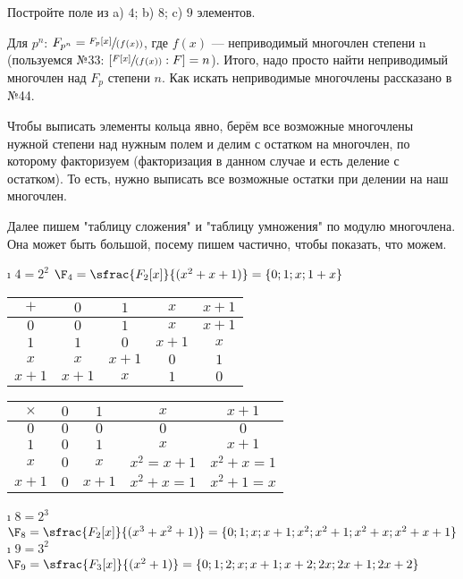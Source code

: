 \begin{problem}[45 (11.3)]
Постройте поле из a) $4$; b) $8$; c) $9$ элементов.
\end{problem}
\begin{solution}

Для \(p^n\): \(F_{p^n} = \sfrac{F_p[x]}{(f(x))}\), где \(f(x)\) --- неприводимый многочлен степени n (пользуемся №33: $[\sfrac{F[x]}{(f(x))}:F] = n$). Итого, надо просто найти неприводимый многочлен над \(F_p\) степени \(n\). Как искать неприводимые многочлены рассказано в №44.

Чтобы выписать элементы кольца явно, берём все возможные многочлены нужной степени над нужным полем и делим с остатком на многочлен, по которому факторизуем (факторизация в данном случае и есть деление с остатком). То есть, нужно выписать все возможные остатки при делении на наш многочлен.

Далее пишем "таблицу сложения" и "таблицу умножения" по модулю многочлена. Она может быть большой, посему пишем частично, чтобы показать, что можем.

\begin{enumerate}
\def\labelenumi{\alph{enumi})}
\tightlist
\i
  \(4=2^2\)
  \(\F_4 = \sfrac{F_2[x]}{(x^2+x+1)} = \{0; 1;x;1+x\}\)
  
	\begin{table}[H]
	\centering
	\begin{tabular}{|c|c|c|c|c|}
	\hline
	$+$  & $0$ & $1$ & $x$    & $x+1$ \\ \hline
	$0$  & $0$ & $1$  & $x$    & $x+1$ \\ \hline
	$1$  & $1$ & $0$  & $x+1$    & $x$\\ \hline
	$x$  & $x$ & $x+1$  & $0$ & $1$\\ \hline
	$x+1$& $x+1$ & $x$& $1$ & $0$\\ \hline
	\end{tabular}
	\end{table}
  
	\begin{table}[H]
	\centering
	\begin{tabular}{|c|c|c|c|c|}
	\hline
	$\times$  & $0$ & $1$ & $x$    & $x+1$ \\ \hline
	$0$  & $0$ & $0$  & $0$    & $0$ \\ \hline
	$1$  & $0$ & $1$  & $x$    & $x+1$\\ \hline
	$x$  & $0$ & $x$  & $x^2=x+1$ & $x^2+x=1$\\ \hline
	$x+1$& $0$ & $x+1$& $x^2+x=1$ & $x^2+1=x$\\ \hline
	\end{tabular}
	\end{table}
\i
  \(8=2^3\)
  \(\F_8 = \sfrac{F_2[x]}{(x^3+x^2+1)} = \{0; 1; x; x+1; x^2; x^2+1; x^2+x; x^2+x+1 \}\)
\i
  \(9=3^2\)
  \(\F_9 = \sfrac{F_3[x]}{(x^2+1)} = \{ 0; 1; 2; x; x+1; x+2; 2x; 2x+1; 2x+2\}\)
\end{enumerate}



\end{solution}


